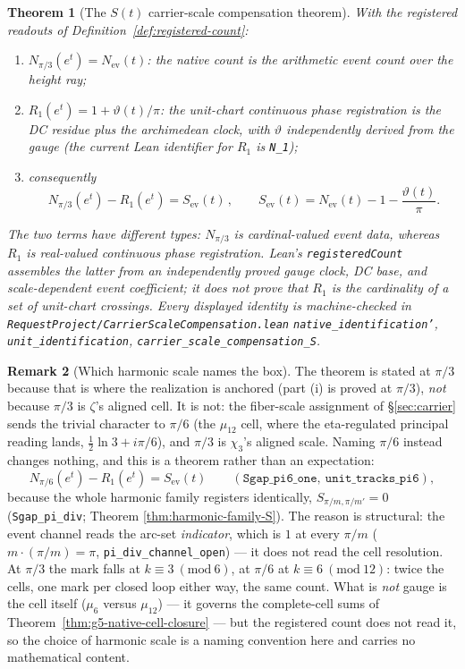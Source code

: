 \documentclass[11pt]{article}
\newtheorem{theorem}{Theorem}
\theoremstyle{definition}
\newtheorem{remark}[theorem]{Remark}
\begin{document}
\begin{theorem}[The \(S(t)\) carrier-scale compensation theorem]\label{thm:carrier-scale-S}
With the registered readouts of Definition~\ref{def:registered-count}:
\begin{enumerate}
\item[\textup{(i)}] \(N_{\pi/3}(e^t)=N_{\mathrm{ev}}(t)\): the native count is the
arithmetic event count over the height ray;
\item[\textup{(ii)}] \(R_1(e^t)=1+\vartheta(t)/\pi\): the unit-chart
\emph{continuous phase registration} is the DC residue plus the
archimedean clock, with \(\vartheta\) independently derived from the gauge
(the current Lean identifier for \(R_1\) is \texttt{N\_1});
\item[\textup{(iii)}] consequently
\[
\boxed{\,N_{\pi/3}(e^t)-R_1(e^t)=S_{\mathrm{ev}}(t)\,},\qquad
S_{\mathrm{ev}}(t)=N_{\mathrm{ev}}(t)-1-\frac{\vartheta(t)}{\pi}.
\]
\end{enumerate}
The two terms have different types: \(N_{\pi/3}\) is cardinal-valued event
data, whereas \(R_1\) is real-valued continuous phase registration.  Lean's
\texttt{registeredCount} assembles the latter from an independently proved
gauge clock, DC base, and scale-dependent event coefficient; it does not
prove that \(R_1\) is the cardinality of a set of unit-chart crossings.  Every
displayed identity is machine-checked in
\texttt{RequestProject/CarrierScaleCompensation.lean}
\texttt{native\_identification'}, \texttt{unit\_identification},
\texttt{carrier\_scale\_compensation\_S}.
\end{theorem}

\begin{remark}[Which harmonic scale names the box]\label{rem:which-harmonic}
The theorem is stated at \(\pi/3\) because that is where the realization is
anchored (part (i) is proved at \(\pi/3\)), \emph{not} because \(\pi/3\) is
\(\zeta\)'s aligned cell.  It is not: the fiber-scale assignment of
\S\ref{sec:carrier} sends the trivial character to \(\pi/6\) (the \(\mu_{12}\)
cell, where the eta-regulated principal reading lands,
\(\tfrac12\ln3+i\pi/6\)), and \(\pi/3\) is \(\chi_3\)'s aligned scale.  Naming
\(\pi/6\) instead changes nothing, and this is a theorem rather than an
expectation:
\[
N_{\pi/6}(e^t)-R_1(e^t)=S_{\mathrm{ev}}(t)
\qquad(\texttt{Sgap\_pi6\_one},\ \texttt{unit\_tracks\_pi6}),
\]
because the whole harmonic family registers identically,
\(S_{\pi/m,\pi/m'}=0\) (\texttt{Sgap\_pi\_div}; Theorem
\ref{thm:harmonic-family-S}).  The reason is structural: the event channel
reads the arc-set \emph{indicator}, which is \(1\) at every \(\pi/m\)
(\(m\cdot(\pi/m)=\pi\), \texttt{pi\_div\_channel\_open}) --- it does not read
the cell resolution.  At \(\pi/3\) the mark falls at \(k\equiv3\ (\mathrm{mod}\
6)\), at \(\pi/6\) at \(k\equiv6\ (\mathrm{mod}\ 12)\): twice the cells, one
mark per closed loop either way, the same count.  What is \emph{not} gauge is
the cell itself (\(\mu_6\) versus \(\mu_{12}\)) --- it governs the complete-cell
sums of Theorem~\ref{thm:g5-native-cell-closure} --- but the registered count
does not read it, so the choice of harmonic scale is a naming convention here
and carries no mathematical content.
\end{remark}
\end{document}
